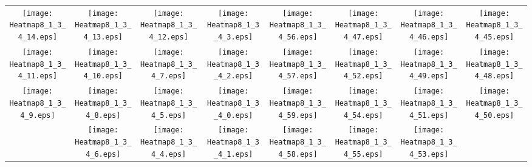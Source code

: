 \documentclass{standalone}
\begin{document}
\begin{tabular}{ *8{c} }
\texttt{[image: Heatmap8\_1\_3\_4\_14.eps]} & \texttt{[image: Heatmap8\_1\_3\_4\_13.eps]} & \texttt{[image: Heatmap8\_1\_3\_4\_12.eps]} & \texttt{[image: Heatmap8\_1\_3\_4\_3.eps]} & \texttt{[image: Heatmap8\_1\_3\_4\_56.eps]} & \texttt{[image: Heatmap8\_1\_3\_4\_47.eps]} & \texttt{[image: Heatmap8\_1\_3\_4\_46.eps]} & \texttt{[image: Heatmap8\_1\_3\_4\_45.eps]} \\
\texttt{[image: Heatmap8\_1\_3\_4\_11.eps]} & \texttt{[image: Heatmap8\_1\_3\_4\_10.eps]} & \texttt{[image: Heatmap8\_1\_3\_4\_7.eps]} & \texttt{[image: Heatmap8\_1\_3\_4\_2.eps]} & \texttt{[image: Heatmap8\_1\_3\_4\_57.eps]} & \texttt{[image: Heatmap8\_1\_3\_4\_52.eps]} & \texttt{[image: Heatmap8\_1\_3\_4\_49.eps]} & \texttt{[image: Heatmap8\_1\_3\_4\_48.eps]} \\
\texttt{[image: Heatmap8\_1\_3\_4\_9.eps]} & \texttt{[image: Heatmap8\_1\_3\_4\_8.eps]} & \texttt{[image: Heatmap8\_1\_3\_4\_5.eps]} & \texttt{[image: Heatmap8\_1\_3\_4\_0.eps]} & \texttt{[image: Heatmap8\_1\_3\_4\_59.eps]} & \texttt{[image: Heatmap8\_1\_3\_4\_54.eps]} & \texttt{[image: Heatmap8\_1\_3\_4\_51.eps]} & \texttt{[image: Heatmap8\_1\_3\_4\_50.eps]} \\
 & \texttt{[image: Heatmap8\_1\_3\_4\_6.eps]} & \texttt{[image: Heatmap8\_1\_3\_4\_4.eps]} & \texttt{[image: Heatmap8\_1\_3\_4\_1.eps]} & \texttt{[image: Heatmap8\_1\_3\_4\_58.eps]} & \texttt{[image: Heatmap8\_1\_3\_4\_55.eps]} & \texttt{[image: Heatmap8\_1\_3\_4\_53.eps]} &  
\end{tabular}
\end{document}
